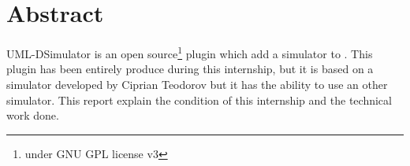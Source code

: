 \chapter*{Abstract}

UML-DSimulator is an open source\footnote{under GNU GPL license v3} plugin which add a simulator to \umld. This plugin has been entirely produce during this internship, but it is based on a simulator developed by Ciprian Teodorov but it has the ability to use an other simulator. This report explain the condition of this internship and the technical work done.



